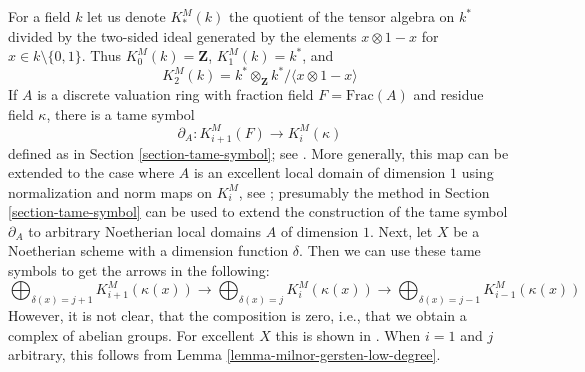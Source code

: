 \begin{remark}
\label{remark-gersten-complex-milnor}
For a field $k$ let us denote $K^M_*(k)$ the quotient of
the tensor algebra on $k^*$ divided by the two-sided ideal
generated by the elements $x \otimes 1 - x$ for $x \in k \setminus \{0, 1\}$.
Thus $K^M_0(k) = \mathbf{Z}$, $K_1^M(k) = k^*$, and
$$
K^M_2(k) = k^* \otimes_\mathbf{Z} k^* / \langle x \otimes 1 - x \rangle
$$
If $A$ is a discrete valuation ring with fraction field $F = \text{Frac}(A)$
and residue field $\kappa$, there is a tame symbol
$$
\partial_A : K_{i + 1}^M(F) \to K_i^M(\kappa)
$$
defined as in Section \ref{section-tame-symbol}; see \cite{Kato-Milnor-K}.
More generally, this map can be extended to the case where $A$ is an
excellent local domain of dimension $1$ using normalization and norm
maps on $K_i^M$, see \cite{Kato-Milnor-K}; presumably the method in
Section \ref{section-tame-symbol} can be used to extend the construction
of the tame symbol $\partial_A$ to arbitrary Noetherian local domains $A$
of dimension $1$. Next, let $X$ be a Noetherian scheme with a
dimension function $\delta$. Then we can use these tame symbols to get
the arrows in the following:
$$
\bigoplus\nolimits_{\delta(x) = j + 1} K^M_{i + 1}(\kappa(x))
\longrightarrow
\bigoplus\nolimits_{\delta(x) = j} K^M_i(\kappa(x))
\longrightarrow
\bigoplus\nolimits_{\delta(x) = j - 1} K^M_{i - 1}(\kappa(x))
$$
However, it is not clear, that the composition is zero, i.e., that
we obtain a complex of abelian groups.
For excellent $X$ this is shown in \cite{Kato-Milnor-K}.
When $i = 1$ and $j$ arbitrary, this follows from
Lemma \ref{lemma-milnor-gersten-low-degree}.
\end{remark}





















